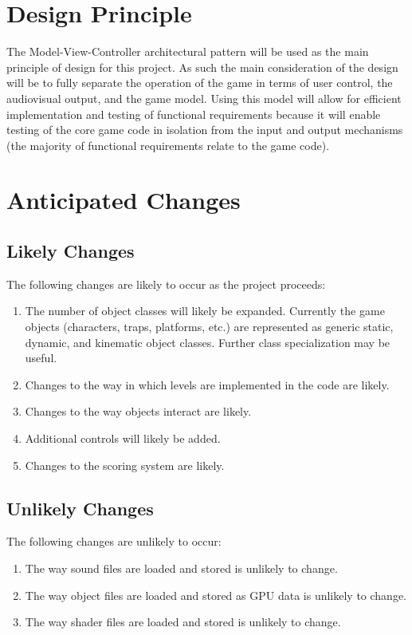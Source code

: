 \documentclass[12pt, titlepage]{article}
\begin{document}
\section{Design Principle}
The Model-View-Controller architectural pattern will be used as the main principle of design for this project.  As such the main consideration of the design will be to fully separate the operation of the game in terms of user control, the audiovisual output, and the game model.  Using this model will allow for efficient implementation and testing of functional requirements because it will enable testing of the core game code in isolation from the input and output mechanisms (the majority of functional requirements relate to the game code).



\section{Anticipated Changes}
\subsection{Likely Changes}
The following changes are likely to occur as the project proceeds:
\begin{enumerate}[label=AC\arabic*]
  \item The number of object classes will likely be expanded.  Currently the game objects (characters, traps, platforms, etc.) are represented as generic static, dynamic, and kinematic object classes.  Further class specialization may be useful.
  \item Changes to the way in which levels are implemented in the code are likely.
  \item Changes to the way objects interact are likely.
  \item Additional controls will likely be added.
  \item Changes to the scoring system are likely.
\end{enumerate}

\subsection{Unlikely Changes}
The following changes are unlikely to occur:
\begin{enumerate}[label=UC\arabic*]
  \item The way sound files are loaded and stored is unlikely to change.
  \item The way object files are loaded and stored as GPU data is unlikely to change. 
  \item The way shader files are loaded and stored is unlikely to change.
\end{enumerate}
\end{document}
